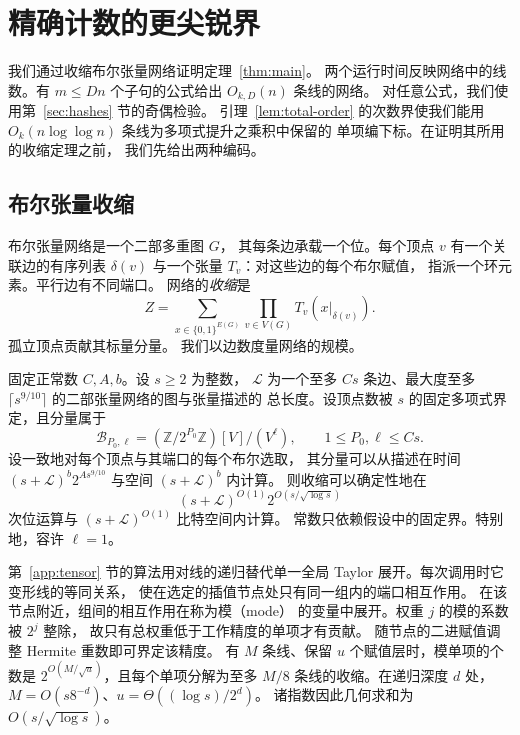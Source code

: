 \section{精确计数的更尖锐界}\label{app:quantitative}

我们通过收缩布尔张量网络证明定理~\ref{thm:main}。
两个运行时间反映网络中的线数。有 $m\le Dn$
个子句的公式给出 $O_{k,D}(n)$ 条线的网络。
对任意公式，我们使用第~\ref{sec:hashes} 节的奇偶检验。
引理~\ref{lem:total-order} 的次数界使我们能用
$O_k(n\log\log n)$ 条线为多项式提升之乘积中保留的
单项编下标。在证明其所用的收缩定理之前，
我们先给出两种编码。

\subsection{布尔张量收缩}
\label{subsec:tensor-interface}

布尔张量网络是一个二部多重图 $G$，
其每条边承载一个位。每个顶点 $v$
有一个关联边的有序列表 $\delta(v)$
与一个张量 $T_v$：对这些边的每个布尔赋值，
指派一个环元素。平行边有不同端口。
网络的\emph{收缩}是
\[
 Z=\sum_{x\in\{0,1\}^{E(G)}}\prod_{v\in V(G)} T_v(x|_{\delta(v)}).
\]
孤立顶点贡献其标量分量。
我们以边数度量网络的规模。

\begin{theorem}[布尔张量收缩]\label{thm:tensor-contraction}
固定正常数 $C,A,b$。设 $s\ge2$ 为整数，
$\mathcal L$ 为一个至多 $Cs$ 条边、最大度至多
$\lceil s^{9/10}\rceil$ 的二部张量网络的图与张量描述的
总长度。设顶点数被 $s$ 的固定多项式界定，且分量属于
\[
 \mathcal B_{P_0,\ell}
   =(\mathbb Z/2^{P_0}\mathbb Z)[V]/(V^\ell),
 \qquad 1\le P_0,\ell\le Cs.
\]
设一致地对每个顶点与其端口的每个布尔选取，
其分量可以从描述在时间 $(s+\mathcal L)^b2^{A s^{9/10}}$
与空间 $(s+\mathcal L)^b$ 内计算。
则收缩可以确定性地在
\[
 (s+\mathcal L)^{O(1)}
  2^{O(s/\sqrt{\log s})}
\]
次位运算与 $(s+\mathcal L)^{O(1)}$ 比特空间内计算。
常数只依赖假设中的固定界。特别地，容许 $\ell=1$。
\end{theorem}

第~\ref{app:tensor} 节的算法用对线的递归替代单一全局
Taylor 展开。每次调用时它变形线的等同关系，
使在选定的插值节点处只有同一组内的端口相互作用。
在该节点附近，组间的相互作用在称为模（mode）
的变量中展开。权重 $j$ 的模的系数被 $2^j$ 整除，
故只有总权重低于工作精度的单项才有贡献。
随节点的二进赋值调整 Hermite 重数即可界定该精度。
有 $M$ 条线、保留 $u$ 个赋值层时，模单项的个数是
$2^{O(M/\sqrt{u})}$，且每个单项分解为至多 $M/8$
条线的收缩。在递归深度 $d$ 处，
$M=O(s8^{-d})$、$u=\Theta((\log s)/2^d)$。
诸指数因此几何求和为 $O(s/\sqrt{\log s})$。

